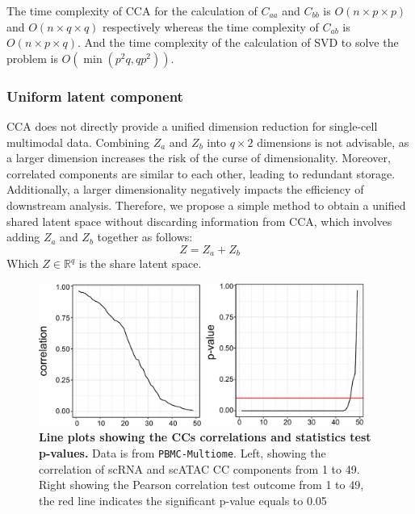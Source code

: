 The time complexity of CCA for the calculation of $C_{aa}$ and $C_{bb}$ is $O(n\times p \times p)$ and $O(n\times q \times q)$ respectively whereas the time complexity of $C_{ab}$ is $O(n\times p \times q)$. And the time complexity of the  calculation of SVD to solve the problem is $O(\min(p^2q,qp^2))$.

\subsubsection{Uniform latent component}
CCA does not directly provide a unified dimension reduction for single-cell multimodal data. Combining $Z_a$ and $Z_b$ into $q\times 2$ dimensions is not advisable, as a larger dimension increases the risk of the curse of dimensionality. Moreover, correlated components are similar to each other, leading to redundant storage. Additionally, a larger dimensionality negatively impacts the efficiency of downstream analysis. Therefore, we propose a simple method to obtain a unified shared latent space without discarding information from CCA, which involves adding $Z_a$ and $Z_b$ together as follows:
\begin{equation}
    Z = Z_a + Z_b
\end{equation}
Which $Z\in \mathbb{R}^{q}$ is the share latent space. 

\begin{figure}[!ht]
	\centering
	\includegraphics[width=0.95\textwidth]{CC_pval_select/fig}
	\vspace{0.1cm}
	\caption[Line plots showing the CCs correlations and statistics test p-values.]{\textbf{Line plots showing the CCs correlations and statistics test p-values.} Data is from \texttt{PBMC-Multiome}. Left, showing the correlation of scRNA and scATAC CC components from 1 to 49. Right showing the Pearson correlation test outcome from 1 to 49, the red line indicates the significant p-value equals to 0.05}
	\label{fig:CC_pval_select}
\end{figure}

